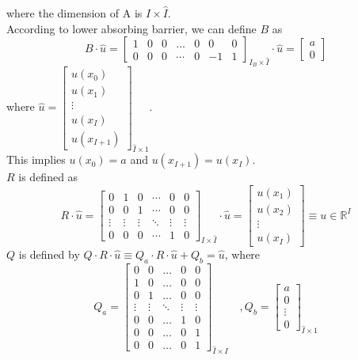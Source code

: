 \documentclass[11pt]{article}
\newcommand{\R}{\ensuremath{\mathbb{R}}}
\begin{document}
where the dimension of A is $I\times\hat{I}$.\\
According to lower absorbing barrier, we can define $B$ as
\begin{equation}
B\cdot\hat{u} =\begin{bmatrix}
1&0&0&\dots&0&0&0\\
0&0&0&\cdots&0&-1&1
\end{bmatrix}_{I_B\times \hat{I}}\cdot\hat{u} = \begin{bmatrix}
a\\
0
\end{bmatrix}
\end{equation}
where $\hat{u} = \begin{bmatrix}
u(x_0)\\
u(x_1)\\
\vdots\\
u(x_I)\\
u(x_{I+1})
\end{bmatrix}_{\hat{I}\times 1}$.\\
This implies $u(x_0) = a$ and $u(x_{I+1}) = u(x_I)$.\\
$R$ is defined as 
\begin{equation}
R\cdot \hat{u} =\begin{bmatrix}
0&1&0&\cdots&0&0\\
0&0&1&\cdots&0&0\\
\vdots&\vdots&\vdots&\ddots&\vdots&\vdots\\
0&0&0&\cdots&1&0
\end{bmatrix}_{I\times\hat{I}}\cdot \hat{u}		 
=\begin{bmatrix}
u(x_1)\\
u(x_2)\\
\vdots\\
u(x_I)
\end{bmatrix} \equiv u\in \R^{I} 
\end{equation}
$Q$ is defined by $Q\cdot R\cdot\hat{u}\equiv Q_a\cdot R\cdot\hat{u}+Q_b = \hat{u}$, where 
\begin{equation}
Q_a = \begin{bmatrix}
0& 0&\dots&0&0\\
1&0&\dots&0&0\\
0&1&\dots&0&0\\
\vdots&\vdots&\ddots&\vdots&\vdots\\
0&0&\dots&1&0\\
0&0&\dots&0&1\\
0&0&\dots&0&1
\end{bmatrix}_{\hat{I}\times I}\quad , Q_b = \begin{bmatrix}
a\\
0\\
\vdots\\
0
\end{bmatrix}_{\hat{I}\times 1}
\end{equation}
\end{document}
